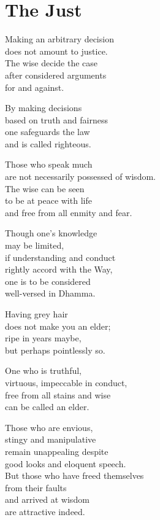 
\chapter{The Just}


Making an arbitrary decision\\
does not amount to justice.\\
The wise decide the case\\
after considered arguments\\
for and against.


By making decisions\\
based on truth and fairness\\
one safeguards the law\\
and is called righteous.


Those who speak much\\
are not necessarily possessed of wisdom.\\
The wise can be seen\\
to be at peace with life\\
and free from all enmity and fear.


Though one's knowledge\\
may be limited,\\
if understanding and conduct\\
rightly accord with the Way,\\
one is to be considered\\
well-versed in Dhamma.


Having grey hair\\
does not make you an elder;\\
ripe in years maybe,\\
but perhaps pointlessly so.


One who is truthful,\\
virtuous, impeccable in conduct,\\
free from all stains and wise\\
can be called an elder.


Those who are envious,\\
stingy and manipulative\\
remain unappealing despite\\
good looks and eloquent speech.\\
But those who have freed themselves\\
from their faults\\
and arrived at wisdom\\
are attractive indeed.


